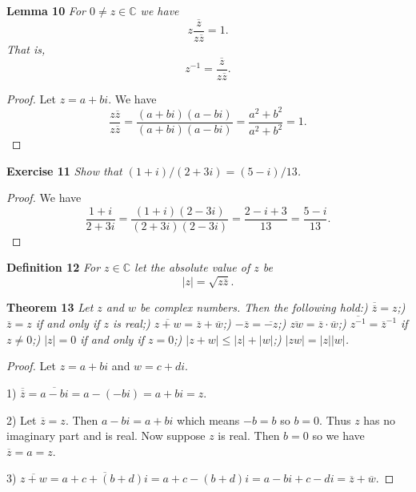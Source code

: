 \documentclass{article}
\begin{document}
\begin{flushleft}
\textbf{Lemma 10}
\textsl{For $0 \neq z \in \mathbb{C}$ we have
\[
z \frac{\overline{z}}{z \overline{z}} = 1.
\]
That is,
\[
z^{-1} = \frac{\overline{z}}{z \overline{z}}.
\]}
\begin{proof}
Let $z = a+bi$. We have
\[
\frac{z \overline{z}}{z \overline{z}} = \frac{(a+bi)(a-bi)}{(a+bi)(a-bi)} = \frac{a^2+b^2}{a^2+b^2} = 1.
\]
\end{proof}

\textbf{Exercise 11}
\textsl{Show that $(1+i)/(2+3i) = (5-i)/13$.}
\begin{proof}
We have
\[
\frac{1+i}{2+3i} = \frac{(1+i)(2-3i)}{(2+3i)(2-3i)} = \frac{2-i+3}{13} = \frac{5-i}{13}.
\]
\end{proof}

\textbf{Definition 12}
\textsl{For $z \in \mathbb{C}$ let the absolute value of $z$ be
\[
|z| = \sqrt{z \overline{z}}.
\]}\newline

\textbf{Theorem 13}
\textsl{Let $z$ and $w$ be complex numbers. Then the following hold:) $\overline{\overline{z}} = z$;) $\overline{z} = z$ if and only if $z$ is real;) $\overline{z+w} = \overline{z} + \overline{w}$;) $-\overline{z} = \overline{-z}$;) $\overline{zw} = \overline{z} \cdot \overline{w}$;) $\overline{z^{-1}} = \overline{z}^{-1}$ if $z \neq 0$;) $|z| = 0$ if and only if $z = 0$;) $|z+w| \leq |z| + |w|$;) $|zw| = |z||w|$.}
\begin{proof}
Let $z = a+bi$ and $w = c+di$.\newline

1) $\overline{\overline{z}} = \overline{a-bi} = a - (-bi) = a+bi = z$.\newline

2) Let $\overline{z} = z$. Then $a-bi = a+bi$ which means $-b = b$ so $b = 0$. Thus $z$ has no imaginary part and is real. Now suppose $z$ is real. Then $b=0$ so we have $\overline{z} = a = z$.\newline

3) $\overline{z+w} = \overline{a+c + (b+d)i} = a+c -(b+d)i = a-bi + c-di = \overline{z} + \overline{w}$.\newline


\end{proof}
\end{flushleft}
\end{document}
